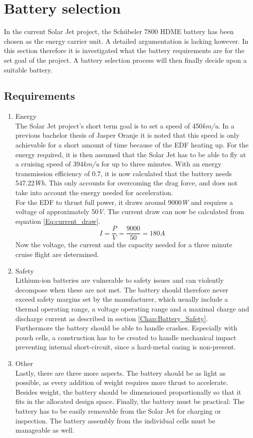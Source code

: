 \section{Battery selection}
\label{Chap:Battery_Selection}
In the current Solar Jet project, the Schübeler 7800 HDME battery has been chosen as the energy carrier unit. A detailed argumentation is lacking however. In this section therefore it is investigated what the battery requirements are for the set goal of the project. A battery selection process will then finally decide upon a suitable battery.
\subsection{Requirements}
\begin{enumerate}
\item Energy\\
The Solar Jet project's short term goal is to set a speed of 450\textit{km/u}. In a previous bachelor thesis of Jasper Oranje \cite{BEP_Jasper} it is noted that this speed is only achievable for a short amount of time because of the EDF heating up. For the energy required, it is then assumed that the Solar Jet has to be able to fly at a cruising speed of 394\textit{km/u} for up to three minutes. With an energy transmission efficiency of 0.7, it is now calculated that the battery needs 547.22\textit{Wh}. This only accounts for overcoming the drag force, and does not take into account the energy needed for acceleration.\\
For the EDF to thrust full power, it draws around 9000\textit{W} and requires a voltage of approximately 50\textit{V}. The current draw can now be calculated from equation \ref{Eq:current_draw}.
\begin{equation}
\label{Eq:current_draw}
I = \frac{P}{V} = \frac{9000}{50} = 180 \textit{A}
\end{equation}
Now the voltage, the current and the capacity needed for a three minute cruise flight are determined.
\item Safety\\
Lithium-ion batteries are vulnerable to safety issues and can violently decompose when these are not met. The battery should therefore never exceed safety margins set by the manufacturer, which usually include a thermal operating range, a voltage operating range and a maximal charge and discharge current as described in section \ref{Chap:Battery_Safety}.\\
Furthermore the battery should be able to handle crashes. Especially with pouch cells, a construction has to be created to handle mechanical impact preventing internal short-circuit, since a hard-metal casing is non-present.
\item Other\\
Lastly, there are three more aspects. The battery should be as light as possible, as every addition of weight requires more thrust to accelerate. Besides weight, the battery should be dimensioned proportionally so that it fits in the allocated design space. Finally, the battery must be practical: The battery has to be easily removable from the Solar Jet for charging or inspection. The battery assembly from the individual cells must be manageable as well.
\end{enumerate}
